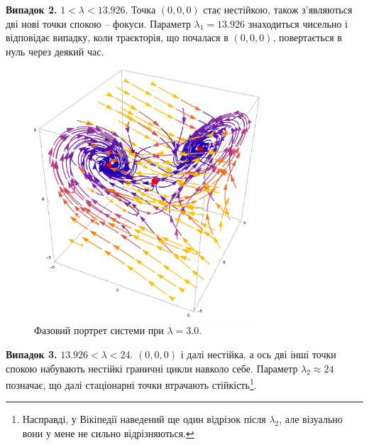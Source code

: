 \documentclass[oneside,solution]{tmpl}
\begin{document}
\textbf{Випадок 2.} $1 < \lambda < 13.926$. Точка $(0,0,0)$ стає нестійкою, також з'являються дві нові точки спокою -- фокуси. Параметр $\lambda_1=13.926$ знаходиться чисельно і відповідає випадку, коли траєкторія, що почалася в $(0,0,0)$, повертається в нуль через деякий час.

\begin{figure}[H]
    \centering
    \includegraphics[width=0.75\textwidth]{images/hw_8/lorentz_case_2.pdf}
    \caption{Фазовий портрет системи при $\lambda = 3.0$.}
\end{figure}

\textbf{Випадок 3.} $13.926 < \lambda < 24$. $(0,0,0)$ і далі нестійка, а ось дві інші точки спокою набувають нестійкі граничні цикли навколо себе. Параметр $\lambda_2 \approx 24$ позначає, що далі стаціонарні точки втрачають стійкість\footnote{Насправді, у Вікіпедії наведений ще один відрізок після $\lambda_2$, але візуально вони у мене не сильно відрізняються.}.
\end{document}
